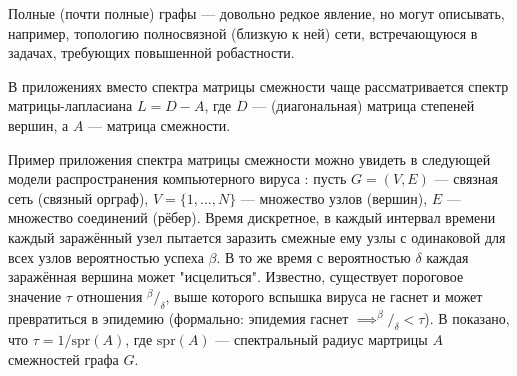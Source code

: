 Полные (почти полные) графы --- довольно редкое явление,
но могут описывать, например, топологию полносвязной (близкую к ней) сети,
встречающуюся в задачах, требующих повышенной робастности.

В приложениях вместо спектра матрицы смежности чаще рассматривается
спектр матрицы-лапласиана \( L = D - A \),
где \( D \) --- (диагональная) матрица степеней вершин,
а \( A \) --- матрица смежности.

Пример приложения спектра матрицы смежности можно увидеть
в следующей модели распространения компьютерного вируса \cite{epidemic-eigenvalues}:
пусть \( G = (V, E) \) --- связная сеть (связный орграф),
\( V = \{1, \ldots, N\} \) --- множество узлов (вершин),
\( E \) --- множество соединений (рёбер).
Время дискретное, в каждый интервал времени каждый заражённый узел
пытается заразить смежные ему узлы с одинаковой для всех узлов вероятностью успеха \( \beta \).
В то же время с вероятностью \( \delta \) каждая заражённая вершина может "исцелиться".
Известно, существует пороговое значение \( \tau \) отношения \( {^\beta}/_{\delta} \),
выше которого вспышка вируса не гаснет и может превратиться в эпидемию
(формально: эпидемия гаснет \( \implies ^{\beta}/_{\delta} < \tau \)).
В \cite{epidemic-eigenvalues} показано, что \( \tau = 1/\mathrm{spr}\left({A}\right) \),
где \( \mathrm{spr}\left({A}\right) \) --- спектральный радиус мартрицы \( A \) смежностей графа \( G \).
